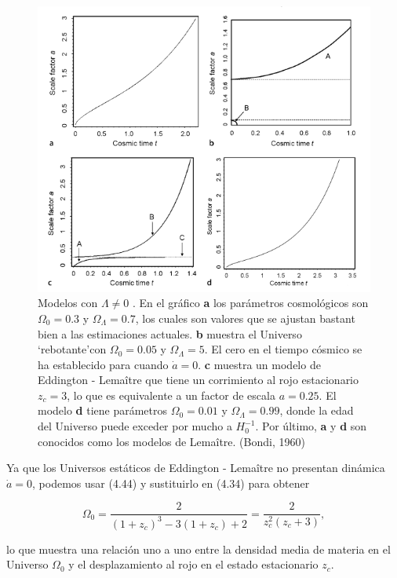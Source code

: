 \documentclass[11pt]{article}
\begin{document}
     \begin{figure}[H]         
     \centering
     \includegraphics[width=1.0\textwidth]{graficos73_pp226Mlalcon.png}
        \caption{\footnotesize{Modelos con $\Lambda \neq 0$ }. En el gráfico {\bf{a}} los parámetros cosmológicos son $\Omega_0=0.3$ y $\Omega_{\Lambda}= 0.7$, los cuales son valores que se ajustan bastant bien a las estimaciones actuales. {\bf{b}} muestra el Universo `rebotante'con $\Omega_0 = 0.05$ y $\Omega_{\Lambda}=5$. El cero en el tiempo cósmico se ha establecido para cuando $\dot{a}=0$. {\bf{c}} muestra un modelo de Eddington - Lema\^itre que tiene un corrimiento al rojo estacionario $z_c = 3$, lo que es equivalente a un factor de escala $a=0.25$. El modelo {\bf{d}} tiene parámetros $\Omega_0 = 0.01$ y $\Omega_{\Lambda}= 0.99$, donde la edad del Universo puede exceder por mucho a $H_0^{-1}$. Por último, {\bf{a}} y {\bf{d}} son conocidos como los modelos de Lema\^itre. (Bondi, 1960)}
     \end{figure}
    
    
    Ya que los Universos estáticos de Eddington - Lema\^itre no presentan dinámica $\dot{a}=0$, podemos usar (4.44) y sustituirlo en (4.34) para obtener
    
    \begin{equation}
        \Omega_0 = \frac{2}{ (1 + z_c)^3 - 3  (1 + z_c) + 2} = \frac{2}{ z_c^2(z_c + 3)},
    \end{equation}
    
    lo que muestra una relación uno a uno entre la densidad media de materia en el Universo $\Omega_0$ y el desplazamiento al rojo en el estado estacionario $z_c$.
    
\end{document}

